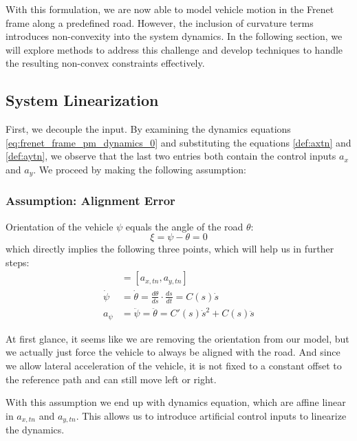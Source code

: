 With this
formulation, we are now able to model vehicle motion in the Frenet frame along a predefined road.
However, the inclusion of curvature terms introduces non-convexity into the system dynamics.
In the following section, we will explore methods to address this challenge and develop techniques to handle the resulting non-convex constraints
effectively.

\subsection{System Linearization} \label{subsec:constraints}

First, we decouple the input.
By examining the dynamics equations \eqref{eq:frenet_frame_pm_dynamics_0} and substituting the equations \eqref{def:axtn} and \eqref{def:aytn}, we
observe that the last two entries both contain the control inputs $a_x$ and $a_y$.
We proceed by making the following assumption:

\subsubsection{Assumption: Alignment Error}

Orientation of the vehicle $\psi$ equals the angle of the road $\theta$:
\begin{equation}
	\xi = \psi - \theta = 0
\end{equation}
which directly implies the following three points, which will help us in further steps:
\begin{align}
	[a_x, a_y] & = [a_{x,tn}, a_{y,tn}]                                                \\
	\dot{\psi} & = \dot{\theta} = \frac{d\theta}{ds} \cdot \frac{ds}{dt} = C(s)\dot{s} \\
	a_\psi     & = \ddot{\psi} = \ddot{\theta} = C'(s) \dot{s}^2 + C(s)\ddot{s}
\end{align}

At first glance, it seems like we are removing the orientation from our model, but we actually just force the vehicle to always be aligned with the
road.
And since we allow lateral acceleration of the vehicle, it is not fixed to a constant offset to the reference path and can still move left or right.

With this assumption we end up with dynamics equation, which are affine linear in $a_{x,tn}$ and $a_{y,tn}$.
This allows us to introduce artificial control inputs to linearize the dynamics.

